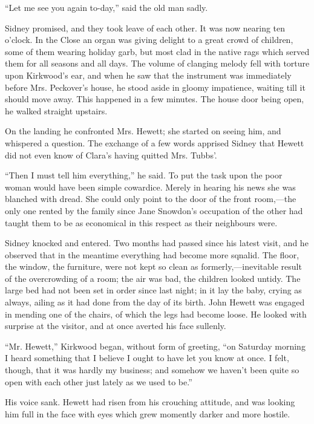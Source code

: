 ``Let me see you again to-day,'' said the old man sadly.

Sidney promised, and they took leave of each other. It was now nearing
ten o'clock. In the Close an organ was giving delight to a great crowd
of children, some of them wearing holiday garb, but most clad in the
native rags which served them for all seasons and all days.
{\protect\hypertarget{282}{}{}}The volume of clanging melody fell with
torture upon Kirkwood's ear, and when he saw that the instrument was
immediately before Mrs. Peckover's house, he stood aside in gloomy
impatience, waiting till it should move away. This happened in a few
minutes. The house door being open, he walked straight upstairs.

On the landing he confronted Mrs. Hewett; she started on seeing him, and
whispered a question. The exchange of a few words apprised Sidney that
Hewett did not even know of Clara's having quitted Mrs. Tubbs'.

``Then I must tell him everything,'' he said. To put the task upon the
poor woman would have been simple cowardice. Merely in hearing his news
she was blanched with dread. She could only point to the door of the
front room,---the only one rented by the family since Jane Snowdon's
occupation of the other had taught them to be as economical in this
respect as their neighbours were.

Sidney knocked and entered. Two months had passed since his latest
visit, and he {\protect\hypertarget{283}{}{}}observed that in the
meantime everything had become more sqnalid. The floor, the window, the
furniture, were not kept so clean as formerly,---inevitable result of
the overcrowding of a room; the air was bad, the children looked untidy.
The large bed had not been set in order since last night; in it lay the
baby, crying as always, ailing as it had done from the day of its birth.
John Hewett was engaged in mending one of the chairs, of which the legs
had become loose. He looked with surprise at the visitor, and at once
averted his face sullenly.

``Mr. Hewett,'' Kirkwood began, without form of greeting, ``on Saturday
morning I heard something that I believe I ought to have let you know at
once. I felt, though, that it was hardly my business; and somehow we
haven't been quite so open with each other just lately as we used to
be.''

His voice sank. Hewett had risen from his crouching attitude, and was
looking him full in the face with eyes which grew momently darker and
more hostile.

